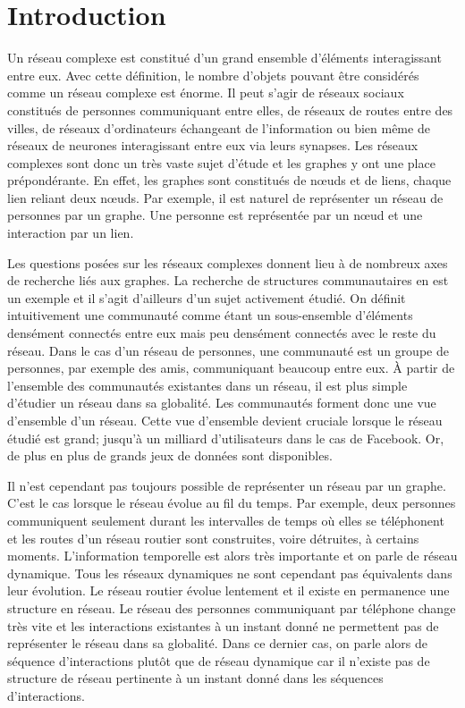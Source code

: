 
\chapter*{Introduction}

Un réseau complexe est constitué d'un grand ensemble d'éléments interagissant entre eux.
Avec cette définition, le nombre d'objets pouvant être considérés comme un réseau complexe est énorme.
Il peut s'agir de réseaux sociaux constitués de personnes communiquant entre elles, de réseaux de routes entre des villes, de réseaux d'ordinateurs échangeant de l'information ou bien même de réseaux de neurones interagissant entre eux via leurs synapses.
Les réseaux complexes sont donc un très vaste sujet d'étude et les graphes y ont une place prépondérante.
En effet, les graphes sont constitués de n\oe{}uds et de liens, chaque lien reliant deux n\oe{}uds.
Par exemple, il est naturel de représenter un réseau de personnes par un graphe. Une personne est représentée par un n\oe{}ud et une interaction par un lien.

Les questions posées sur les réseaux complexes donnent lieu à de nombreux axes de recherche liés aux graphes.
La recherche de structures communautaires en est un exemple et il s'agit d'ailleurs d'un sujet activement étudié.
On définit intuitivement une communauté comme étant un sous-ensemble d’éléments densément connectés entre eux mais peu densément connectés avec le reste du réseau.
Dans le cas d'un réseau de personnes, une communauté est un groupe de personnes, par exemple des amis, communiquant beaucoup entre eux.
\`A partir de l'ensemble des communautés existantes dans un réseau, il est plus simple d'étudier un réseau dans sa globalité.
Les communautés forment donc une vue d'ensemble d'un réseau.
Cette vue d'ensemble devient cruciale lorsque le réseau étudié est grand; jusqu'à un milliard d'utilisateurs dans le cas de Facebook.
Or, de plus en plus de grands jeux de données sont disponibles.


Il n'est cependant pas toujours possible de représenter un réseau par un graphe.
C'est le cas lorsque le réseau évolue au fil du temps.
Par exemple, deux personnes communiquent seulement durant les intervalles de temps où elles se téléphonent et les routes d'un réseau routier sont construites, voire détruites, à certains moments.
L'information temporelle est alors très importante et on parle de réseau dynamique.
Tous les réseaux dynamiques ne sont cependant pas équivalents dans leur évolution.
Le réseau routier évolue lentement et il existe en permanence une structure en réseau.
Le réseau des personnes communiquant par téléphone change très vite et les interactions existantes à un instant donné ne permettent pas de représenter le réseau dans sa globalité.
Dans ce dernier cas, on parle alors de séquence d'interactions plutôt que de réseau dynamique car il n'existe pas de structure de réseau pertinente à un instant donné dans les séquences d'interactions.



